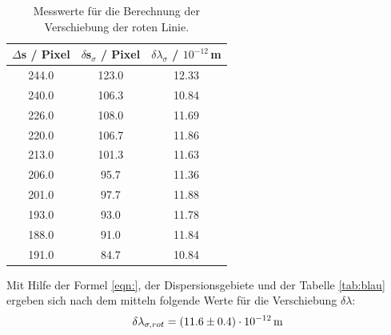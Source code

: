 \begin{table}[H]
  \centering
  \caption{Messwerte für die Berechnung der Verschiebung der roten Linie.}
  \label{tab:rot}
  \begin{tabular}{c c c}
    $\Delta$s / Pixel & $\delta$s$_{\sigma}$ / Pixel & $\delta \lambda_{\sigma}$ / $10^{-12}$\,m \\
    \hline
    244.0 & 123.0 & 12.33 \\
    240.0 & 106.3 & 10.84 \\
    226.0 & 108.0 & 11.69 \\
    220.0 & 106.7 & 11.86 \\
    213.0 & 101.3 & 11.63 \\
    206.0 & 95.7  & 11.36 \\
    201.0 & 97.7  & 11.88 \\
    193.0 & 93.0  & 11.78 \\
    188.0 & 91.0  & 11.84 \\
    191.0 & 84.7  & 10.84 \\
    \hline
  \end{tabular}
\end{table}


Mit Hilfe der Formel \eqref{eqn:}, der Dispersionsgebiete und der Tabelle \eqref{tab:blau} ergeben sich nach dem mitteln folgende Werte für die Verschiebung $\delta\lambda$:
\begin{align*}
  \delta \lambda_{\sigma,rot} = (\num{11.6 +- 0.4})\cdot 10^{-12}\,\text{m} \\
\end{align*}
